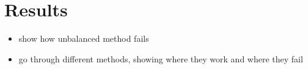\chapter{Results}
\label{ch:results}

\begin{itemize}
  \item show how unbalanced method fails
  \item go through different methods, showing where they work and where they fail
\end{itemize}